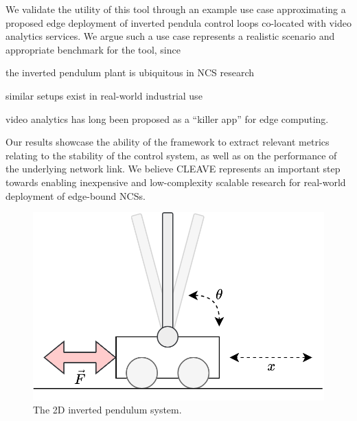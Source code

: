 We validate the utility of this tool through an example use case approximating a proposed edge deployment of inverted pendula control loops co-located with video analytics services.
We argue such a use case represents a realistic scenario and appropriate benchmark for the tool, since
\begin{enumerate*}[itemjoin={{; }}, itemjoin*={{; and }}]
    \item the inverted pendulum plant is ubiquitous in \ac{NCS} research
    \item similar setups exist in real-world industrial use
    \item video analytics has long been proposed as a ``killer app'' for edge computing.
\end{enumerate*}
Our results showcase the ability of the framework to extract relevant metrics relating to the stability of the control system, as well as on the performance of the underlying network link.
We believe \ac{CLEAVE} represents an important step towards enabling inexpensive and low-complexity scalable research for real-world deployment of edge-bound \acp{NCS}.


\begin{figure}
    \centering
    \includegraphics[width=.6\columnwidth]{publications/2022CLEAVE/images/inverted_pendulum.png}
    \caption{
        The 2D inverted pendulum system.
    }\label{fig:invpend}
\end{figure}

